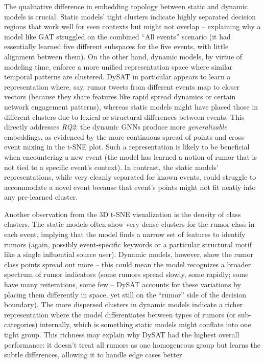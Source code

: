 \documentclass{cshonours}
\begin{document}
The qualitative difference in embedding topology between static and dynamic models is crucial. Static models’ tight clusters indicate highly separated decision regions that work well for seen contexts but might not overlap – explaining why a model like GAT struggled on the combined “All events” scenario (it had essentially learned five different subspaces for the five events, with little alignment between them). On the other hand, dynamic models, by virtue of modeling time, enforce a more unified representation space where similar temporal patterns are clustered. DySAT in particular appears to learn a representation where, say, rumor tweets from different events map to closer vectors (because they share features like rapid spread dynamics or certain network engagement patterns), whereas static models might have placed those in different clusters due to lexical or structural differences between events. This directly addresses \emph{RQ2}: the dynamic GNNs produce more \emph{generalizable} embeddings, as evidenced by the more continuous spread of points and cross-event mixing in the t-SNE plot. Such a representation is likely to be beneficial when encountering a new event (the model has learned a notion of rumor that is not tied to a specific event’s context). In contrast, the static models’ representations, while very cleanly separated for known events, could struggle to accommodate a novel event because that event’s points might not fit neatly into any pre-learned cluster.

Another observation from the 3D t-SNE visualization is the density of class clusters. The static models often show very dense clusters for the rumor class in each event, implying that the model finds a narrow set of features to identify rumors (again, possibly event-specific keywords or a particular structural motif like a single influential source user). Dynamic models, however, show the rumor class points spread out more – this could mean the model recognizes a broader spectrum of rumor indicators (some rumors spread slowly, some rapidly; some have many reiterations, some few – DySAT accounts for these variations by placing them differently in space, yet still on the “rumor” side of the decision boundary). The more dispersed clusters in dynamic models indicate a richer representation where the model differentiates between types of rumors (or sub-categories) internally, which is something static models might conflate into one tight group. This richness may explain why DySAT had the highest overall performance: it doesn’t treat all rumors as one homogeneous group but learns the subtle differences, allowing it to handle edge cases better.
\end{document}
